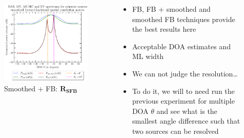 \documentclass[UKenglish,8pt,aspectratio=1610]{beamer}
\begin{document}
\begin{frame}
\begin{columns}
\begin{column}{0.33\textwidth}
\begin{figure}[h!]
		\includegraphics[scale=0.27]{question8/spectrums/part_A_question_8_all_spectrums_smoothed_forward_backward_spatial_correlation_matrix}
		\caption{Smoothed + FB: $\mathbf{R_{SFB}}$}
	\end{figure}
\end{column}
	\begin{column}{0.33\textwidth}
\begin{itemize}
	\item FB, FB + smoothed and smoothed FB techniques provide the best results here
	\item Acceptable DOA estimates and ML width
	\item We can not judge the resolution\dots 
	\item To do it, we will to need run the previous experiment for multiple DOA $\theta$ and see what is the smallest angle difference such that two sources can be resolved
\end{itemize}
\end{column}
\end{columns}
\end{frame}
\end{document}
